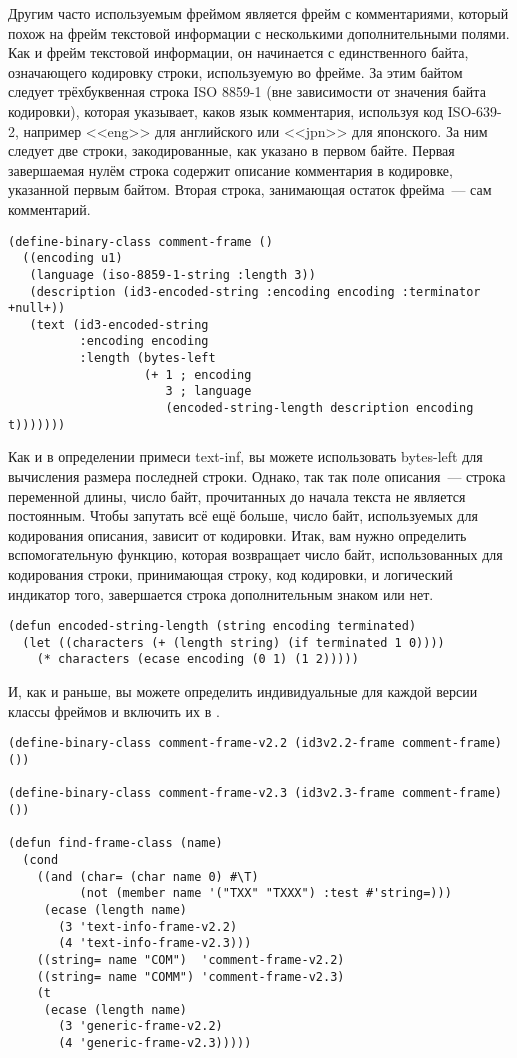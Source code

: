 Другим часто используемым фреймом является фрейм с комментариями, который похож на фрейм
текстовой информации с несколькими дополнительными полями. Как и фрейм текстовой
информации, он начинается с единственного байта, означающего кодировку строки,
используемую во фрейме. За этим байтом следует трёхбуквенная строка ISO 8859-1 (вне
зависимости от значения байта кодировки), которая указывает, каков язык комментария,
используя код ISO-639-2, например <<eng>> для английского или <<jpn>> для японского. За ним
следует две строки, закодированные, как указано в первом байте. Первая завершаемая нулём
строка содержит описание комментария в кодировке, указанной первым байтом. Вторая строка,
занимающая остаток фрейма~--- сам комментарий.

\begin{lstlisting}
(define-binary-class comment-frame ()
  ((encoding u1)
   (language (iso-8859-1-string :length 3))
   (description (id3-encoded-string :encoding encoding :terminator +null+))
   (text (id3-encoded-string
          :encoding encoding
          :length (bytes-left
                   (+ 1 ; encoding
                      3 ; language
                      (encoded-string-length description encoding t)))))))
\end{lstlisting}

Как и в определении примеси text-inf, вы можете использовать bytes-left для вычисления
размера последней строки. Однако, так так поле описания~--- строка переменной длины, число
байт, прочитанных до начала текста не является постоянным. Чтобы запутать всё ещё больше,
число байт, используемых для кодирования описания, зависит от кодировки. Итак, вам нужно
определить вспомогательную функцию, которая возвращает число байт, использованных для
кодирования строки, принимающая строку, код кодировки, и логический индикатор того,
завершается строка дополнительным знаком или нет.

\begin{lstlisting}
(defun encoded-string-length (string encoding terminated)
  (let ((characters (+ (length string) (if terminated 1 0))))
    (* characters (ecase encoding (0 1) (1 2)))))
\end{lstlisting}

И, как и раньше, вы можете определить индивидуальные для каждой версии классы фреймов и
включить их в .

\begin{lstlisting}
(define-binary-class comment-frame-v2.2 (id3v2.2-frame comment-frame) ())

(define-binary-class comment-frame-v2.3 (id3v2.3-frame comment-frame) ())

(defun find-frame-class (name)
  (cond
    ((and (char= (char name 0) #\T)
          (not (member name '("TXX" "TXXX") :test #'string=)))
     (ecase (length name)
       (3 'text-info-frame-v2.2)
       (4 'text-info-frame-v2.3)))
    ((string= name "COM")  'comment-frame-v2.2)
    ((string= name "COMM") 'comment-frame-v2.3)
    (t
     (ecase (length name)
       (3 'generic-frame-v2.2)
       (4 'generic-frame-v2.3)))))
\end{lstlisting}

